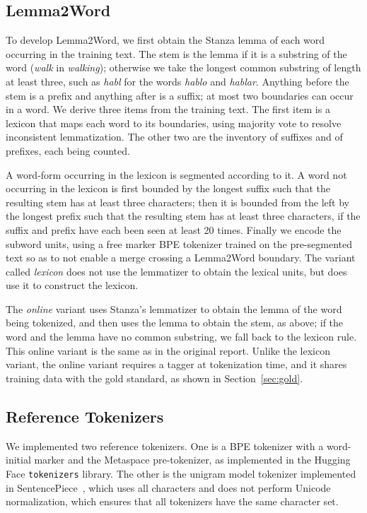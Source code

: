 \subsection{Lemma2Word}\label{sec:l2w}
To develop Lemma2Word, we first obtain the Stanza lemma of each word occurring in the training text.
The stem is the lemma if it is a substring of the word (\emph{walk} in \emph{walking}); otherwise we take the longest common substring of length at least three, such as \emph{habl} for the words \emph{hablo} and \emph{hablar}.
Anything before the stem is a prefix and anything after is a suffix; at most two boundaries can occur in a word.
We derive three items from the training text.
The first item is a lexicon that maps each word to its boundaries, using majority vote to resolve inconsistent lemmatization.
The other two are the inventory of suffixes and of prefixes, each being counted.

A word-form occurring in the lexicon is segmented according to it.
A word not occurring in the lexicon is first bounded by the longest suffix such that the resulting stem has at least three characters; then it is bounded from the left by the longest prefix such that the resulting stem has at least three characters, if the suffix and prefix have each been seen at least 20 times.
Finally we encode the subword units, using a free marker BPE tokenizer trained on the pre-segmented text so as to not enable a merge crossing a Lemma2Word boundary.
The variant called \emph{lexicon} does not use the lemmatizer to obtain the lexical units, but does use it to construct the lexicon.

The \emph{online} variant uses Stanza's lemmatizer to obtain the lemma of the word being tokenized, and then uses the lemma to obtain the stem, as above; if the word and the lemma have no common substring, we fall back to the lexicon rule.
This online variant is the same as in the original report.
Unlike the lexicon variant, the online variant requires a tagger at tokenization time, and it shares training data with the gold standard, as shown in Section~\ref{sec:gold}.

\subsection{Reference Tokenizers}
We implemented two reference tokenizers.
One is a BPE tokenizer with a word-initial marker and the Metaspace pre-tokenizer, as implemented in the Hugging Face \texttt{tokenizers} library.
The other is the unigram model tokenizer implemented in SentencePiece~\cite{kudo2018subword}, which uses all characters and does not perform Unicode normalization, which ensures that all tokenizers have the same character set.

